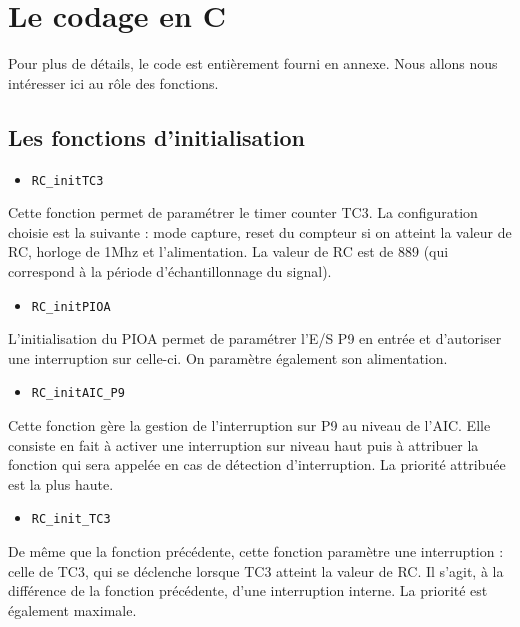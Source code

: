 \documentclass[a4paper]{report}
\begin{document}
\section{Le codage en C}
Pour plus de détails, le code est entièrement fourni en annexe.
Nous allons nous intéresser ici au rôle des fonctions.

\subsection{Les fonctions d’initialisation}
\begin{itemize}
\item \texttt{RC\_initTC3}
\end{itemize}
Cette fonction permet de paramétrer le timer counter TC3.
La configuration choisie est la suivante :
mode capture, reset du compteur si on atteint la valeur de RC, horloge de 1Mhz et l’alimentation.
La valeur de RC est de 889 (qui correspond à la période d’échantillonnage du signal).
\begin{itemize}
\item \texttt{RC\_initPIOA}
\end{itemize}
L’initialisation du PIOA permet de paramétrer l’E/S P9 en entrée et d’autoriser une interruption sur celle-ci.
On paramètre également son alimentation.
\begin{itemize}
\item \texttt{RC\_initAIC\_P9}
\end{itemize}
Cette fonction gère la gestion de l’interruption sur P9 au niveau de l’AIC.
Elle consiste en fait à activer une interruption sur niveau haut puis à attribuer la fonction qui sera appelée en cas de détection d’interruption.
La priorité attribuée est la plus haute.
\begin{itemize}
\item \texttt{RC\_init\_TC3}
\end{itemize}
De même que la fonction précédente, cette fonction paramètre une interruption : celle de TC3, qui se déclenche lorsque TC3 atteint la valeur de RC.
Il s’agit, à la différence de la fonction précédente, d’une interruption interne.
La priorité est également maximale.
\end{document}
